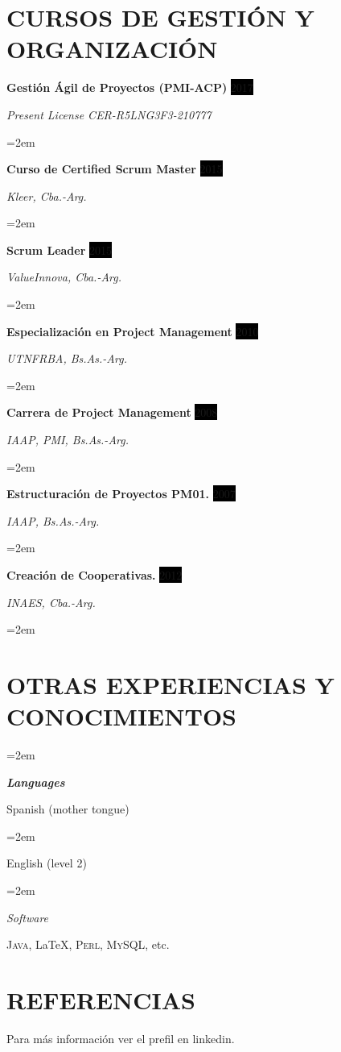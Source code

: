 \documentclass[paper=a4,fontsize=11pt]{scrartcl} %
\newlength{\spacebox}
\newcommand{\sepspace}{\vspace*{1em}}		%
\newcommand{\NewPart}[1]{\section*{\uppercase{#1}}}
\newcommand{\PersonalEntry}[2]{
		\noindent\hangindent=2em\hangafter=0 %
		\parbox{\spacebox}{        %
		\textit{#1}}		       %
		\hspace{1.5em} #2 \par}    %
\newcommand{\SkillsEntry}[2]{      %
		\noindent\hangindent=2em\hangafter=0 %
		\parbox{\spacebox}{        %
		\textit{#1}}			   %
		\hspace{1.5em} #2 \par}    %
\newcommand{\EducationEntry}[4]{
		\noindent \textbf{#1} \hfill      %
		\colorbox{Black}{%
			\parbox{6em}{%
			\hfill\color{White}#2}} \par  %
		\noindent \textit{#3} \par        %
		\noindent\hangindent=2em\hangafter=0 \small #4 %
		\normalsize \par}
\newcommand{\CoursesEntry}[4]{				  %
		\noindent \textbf{#1} \hfill      %
		\colorbox{Black}{\color{White}#2} \par  %
		\noindent \textit{#3} \par              %
		\noindent\hangindent=2em\hangafter=0 \small #4 %
		\normalsize \par}
\begin{document}
\NewPart{Cursos de Gestión y Organización}{}

\CoursesEntry{Gestión Ágil de Proyectos (PMI-ACP)}{2017}{Present License CER-R5LNG3F3-210777}{}
\CoursesEntry{Curso de Certified Scrum Master}{2015}{Kleer, Cba.-Arg.}{}
\CoursesEntry{Scrum Leader}{2015}{ValueInnova, Cba.-Arg.}{}
\CoursesEntry{Especialización en Project Management}{2010}{UTNFRBA, Bs.As.-Arg.}{}
\CoursesEntry{Carrera de Project Management}{2008}{IAAP, PMI, Bs.As.-Arg.}{}
\CoursesEntry{Estructuración de Proyectos PM01.}{2007}{IAAP, Bs.As.-Arg.}{}
\CoursesEntry{Creación de Cooperativas.}{2012}{INAES, Cba.-Arg.}{}

\sepspace

\NewPart{Otras Experiencias y Conocimientos}{}

\sepspace

\SkillsEntry{\textbf{Languages}}{Spanish (mother tongue)}
\SkillsEntry{}{English (level 2)}

\sepspace

\SkillsEntry{Software}{
\textsc{Java}, \LaTeX, \textsc{Perl}, \textsc{MySQL}, etc.
}


\NewPart{Referencias}{}
Para más información ver el prefil en linkedin.

\sepspace
\end{document}

